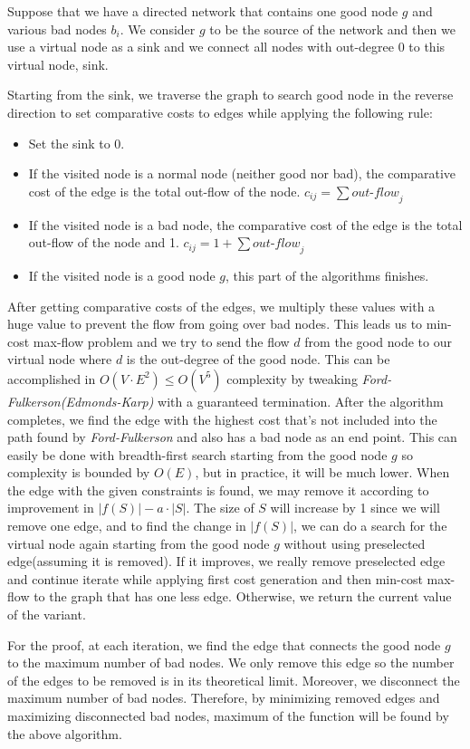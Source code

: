 Suppose that we have a directed network that contains one good node $g$ and various bad nodes $b_i$. We consider $g$ to be the source of the network and then we use a virtual node as a sink and we connect all nodes with out-degree 0 to this virtual node, sink.

Starting from the sink, we traverse the graph to search good node in the reverse direction to set comparative costs to edges while applying the following rule:
\begin{itemize}
  \item Set the sink to 0.
  \item If the visited node is a normal node (neither good nor bad), the comparative cost of the edge is the total out-flow of the node. $c_{ij} = \sum \textit{out-flow}_j$
  \item If the visited node is a bad node, the comparative cost of the edge is the total out-flow of the node and 1. $c_{ij} = 1 + \sum \textit{out-flow}_j$
  \item If the visited node is a good node $g$, this part of the algorithms finishes.
\end{itemize}

After getting comparative costs of the edges, we multiply these values with a huge value to prevent the flow from going over bad nodes. This leads us to min-cost max-flow problem and we try to send the flow $d$ from the good node to our virtual node where $d$ is the out-degree of the good node. This can be accomplished in $O(V \cdot E^2) \leq O(V^5)$ complexity by tweaking \textit{Ford-Fulkerson(Edmonds-Karp)} with a guaranteed termination. After the algorithm completes, we find the edge with the highest cost that's not included into the path found by \textit{Ford-Fulkerson} and also has a bad node as an end point. This can easily be done with breadth-first search starting from the good node $g$ so complexity is bounded by $O(E)$, but in practice, it will be much lower. When the edge with the given constraints is found, we may remove it according to improvement in $|f(S)| - a \cdot |S|$. The size of $S$ will increase by 1 since we will remove one edge, and to find the change in $|f(S)|$, we can do a search for the virtual node again starting from the good node $g$ without using preselected edge(assuming it is removed). If it improves, we really remove preselected edge and continue iterate while applying first cost generation and then min-cost max-flow to the graph that has one less edge. Otherwise, we return the current value of the variant.

For the proof, at each iteration, we find the edge that connects the good node $g$ to the maximum number of bad nodes. We only remove this edge so the number of the edges to be removed is in its theoretical limit. Moreover, we disconnect the maximum number of bad nodes. Therefore, by minimizing removed edges and maximizing disconnected bad nodes, maximum of the function will be found by the above algorithm.